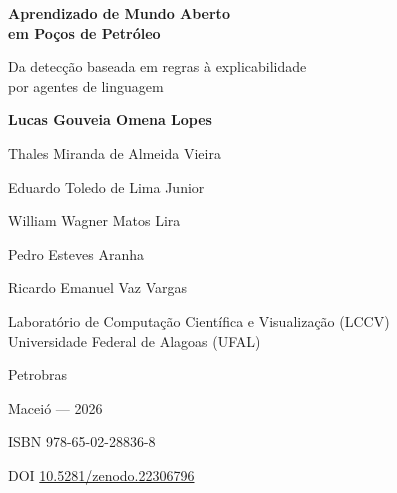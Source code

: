 \documentclass[11pt,a4paper,twoside,openright]{book}
\begin{document}
\frontmatter

\begin{titlepage}
\centering
\vspace*{3cm}
{\Huge\bfseries Aprendizado de Mundo Aberto\\[0.4em] em Poços de Petróleo\par}
\vspace{1.2cm}
{\Large Da detecção baseada em regras à explicabilidade\\ por agentes de linguagem\par}
\vspace{3cm}
{\Large\bfseries Lucas Gouveia Omena Lopes\par}
\vspace{0.6cm}
{\large Thales Miranda de Almeida Vieira\par}
{\large Eduardo Toledo de Lima Junior\par}
{\large William Wagner Matos Lira\par}
\vspace{0.6cm}
{\large Pedro Esteves Aranha\par}
{\large Ricardo Emanuel Vaz Vargas\par}
\vfill
{\large Laboratório de Computação Científica e Visualização (LCCV)\\
Universidade Federal de Alagoas (UFAL)\par}
\vspace{0.4cm}
{\large Petrobras\par}
\vspace{0.8cm}
{\large Maceió --- 2026\par}
\vspace{0.5cm}
{\normalsize ISBN 978-65-02-28836-8\par}
{\normalsize DOI \href{https://doi.org/10.5281/zenodo.22306796}{10.5281/zenodo.22306796}\par}
\end{titlepage}

\cleardoublepage


\cleardoublepage

\cleardoublepage


\cleardoublepage
\tableofcontents
\cleardoublepage
\listoffigures
\cleardoublepage
\listoftables

\cleardoublepage

\cleardoublepage

\end{document}

